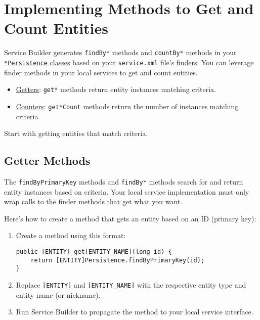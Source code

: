 \chapter{Implementing Methods to Get and Count
Entities}\label{implementing-methods-to-get-and-count-entities}

Service Builder generates \texttt{findBy*} methods and \texttt{countBy*}
methods in your
\href{/docs/7-2/appdev/-/knowledge_base/a/understanding-the-code-generated-by-service-builder}{\texttt{*Persistence}
classes} based on your \texttt{service.xml} file's
\href{/docs/7-2/appdev/-/knowledge_base/a/defining-service-entity-finder-methods}{finders}.
You can leverage finder methods in your local services to get and count
entities.

\begin{itemize}
\tightlist
\item
  \hyperref[getter-methods]{Getters}: \texttt{get*} methods return
  entity instances matching criteria.
\item
  \hyperref[counter-methods]{Counters}: \texttt{get*Count} methods
  return the number of instances matching criteria
\end{itemize}

Start with getting entities that match criteria.

\section{Getter Methods}\label{getter-methods}

The \texttt{findByPrimaryKey} methods and \texttt{findBy*} methods
search for and return entity instances based on criteria. Your local
service implementation must only wrap calls to the finder methods that
get what you want.

Here's how to create a method that gets an entity based on an ID
(primary key):

\begin{enumerate}
\def\labelenumi{\arabic{enumi}.}
\item
  Create a method using this format:

\begin{verbatim}
public [ENTITY] get[ENTITY_NAME](long id) {
    return [ENTITY]Persistence.findByPrimaryKey(id);
}
\end{verbatim}
\item
  Replace \texttt{{[}ENTITY{]}} and \texttt{{[}ENTITY\_NAME{]}} with the
  respective entity type and entity name (or nickname).
\item
  Run Service Builder to propagate the method to your local service
  interface.
\end{enumerate}

